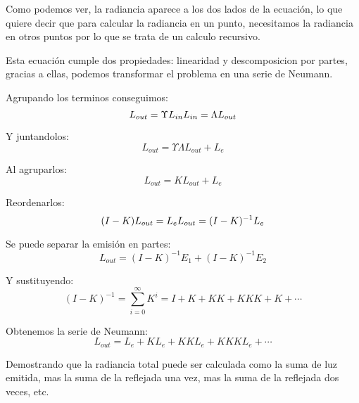     Como podemos ver, la radiancia aparece a los dos lados de la ecuaci\'on, lo que quiere decir que para calcular la radiancia
    en un punto, necesitamos la radiancia en otros puntos por lo que se trata de un calculo recursivo.

    Esta ecuaci\'on cumple dos propiedades: linearidad y descomposicion por partes, gracias a ellas, podemos transformar el problema
    en una serie de Neumann.

    Agrupando los terminos conseguimos:
    \begin{equation}
        L_{out} = \Upsilon L_{in}\\
        L_{in} = \Lambda L_{out}
    \end{equation}
    \singlespacing

    Y juntandolos:
    \begin{equation}
        L_{out} = \Upsilon\Lambda L_{out} + L_e
    \end{equation}
    \singlespacing

    Al agruparlos:
    \begin{equation}
        L_{out} = K L_{out} + L_e
    \end{equation}
    \singlespacing

    Reordenarlos:
    \begin{equation}
        (I-K)L_{out} = L_e\\
        L_{out} = (I - K)^{-1}L_e
    \end{equation}
    \singlespacing

    Se puede separar la emisi\'on en partes:
    \begin{equation}
        L_{out} = (I - K)^{-1}E_1 + (I-K)^{-1}E_2
    \end{equation}
    \singlespacing

    Y sustituyendo:
    \begin{equation}
        (I - K)^{-1} = \sum_{i=0}^{\infty}K^i = I + K + KK + KKK + K + \dotsi
    \end{equation}
    \singlespacing

    Obtenemos la serie de Neumann:
    \begin{equation}
        L_{out} = L_e + KL_e + KKL_e + KKKL_e + \dotsi
    \end{equation}
    \singlespacing

    Demostrando que la radiancia total puede ser calculada como la suma de luz emitida, mas la suma de la reflejada una vez,
    mas la suma de la reflejada dos veces, etc.


